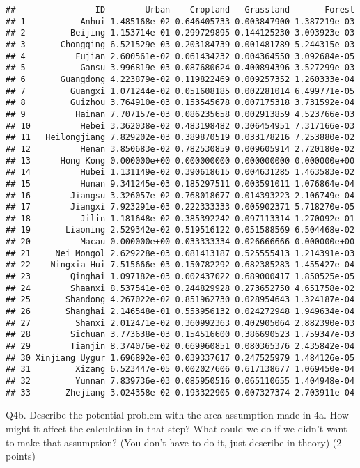 \documentclass[
]{article}
\begin{document}
\begin{verbatim}
##                ID        Urban    Cropland   Grassland       Forest
## 1           Anhui 1.485168e-02 0.646405733 0.003847900 1.387219e-03
## 2         Beijing 1.153714e-01 0.299729895 0.144125230 3.093923e-03
## 3       Chongqing 6.521529e-03 0.203184739 0.001481789 5.244315e-03
## 4          Fujian 2.600561e-02 0.061434232 0.004364550 3.092684e-05
## 5           Gansu 3.996819e-03 0.087680624 0.400894396 3.527299e-03
## 6       Guangdong 4.223879e-02 0.119822469 0.009257352 1.260333e-04
## 7         Guangxi 1.071244e-02 0.051608185 0.002281014 6.499771e-05
## 8         Guizhou 3.764910e-03 0.153545678 0.007175318 3.731592e-04
## 9          Hainan 7.707157e-03 0.086235658 0.002913859 4.523766e-03
## 10          Hebei 3.362038e-02 0.483198482 0.306454951 7.317166e-03
## 11   Heilongjiang 7.829202e-03 0.389870519 0.033178216 7.253880e-02
## 12          Henan 3.850683e-02 0.782530859 0.009605914 2.720180e-02
## 13      Hong Kong 0.000000e+00 0.000000000 0.000000000 0.000000e+00
## 14          Hubei 1.131149e-02 0.390618615 0.004631285 1.463583e-02
## 15          Hunan 9.341245e-03 0.185297511 0.003591011 1.076864e-04
## 16        Jiangsu 3.326057e-02 0.768018677 0.014393223 2.106749e-04
## 17        Jiangxi 7.923291e-03 0.222333333 0.005902371 5.718270e-05
## 18          Jilin 1.181648e-02 0.385392242 0.097113314 1.270092e-01
## 19       Liaoning 2.529342e-02 0.519516122 0.051588569 6.504468e-02
## 20          Macau 0.000000e+00 0.033333334 0.026666666 0.000000e+00
## 21     Nei Mongol 2.629228e-03 0.081413187 0.525555413 1.214391e-03
## 22    Ningxia Hui 7.515666e-03 0.150782292 0.682385283 1.455427e-04
## 23        Qinghai 1.097182e-03 0.002437022 0.689000417 1.850525e-05
## 24        Shaanxi 8.537541e-03 0.244829928 0.273652750 4.651758e-02
## 25       Shandong 4.267022e-02 0.851962730 0.028954643 1.324187e-04
## 26       Shanghai 2.146548e-01 0.553956132 0.024272948 1.949634e-04
## 27         Shanxi 2.012471e-02 0.360992363 0.402905064 2.882390e-03
## 28        Sichuan 3.773638e-03 0.154516600 0.386690523 1.759347e-03
## 29        Tianjin 8.374076e-02 0.669960851 0.080365376 2.435842e-04
## 30 Xinjiang Uygur 1.696892e-03 0.039337617 0.247525979 1.484126e-05
## 31         Xizang 6.523447e-05 0.002027606 0.617138677 1.069450e-04
## 32         Yunnan 7.839736e-03 0.085950516 0.065110655 1.404948e-04
## 33       Zhejiang 3.024358e-02 0.193322905 0.007327374 2.703911e-04
\end{verbatim}

Q4b. Describe the potential problem with the area assumption made in 4a.
How might it affect the calculation in that step? What could we do if we
didn't want to make that assumption? (You don't have to do it, just
describe in theory) (2 points)
\end{document}
